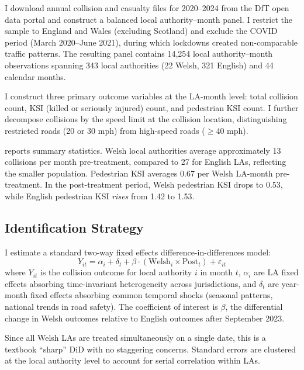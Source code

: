 \documentclass[12pt]{article}
\begin{document}
I download annual collision and casualty files for 2020--2024 from the DfT open data portal and construct a balanced local authority--month panel. I restrict the sample to England and Wales (excluding Scotland) and exclude the COVID period (March 2020--June 2021), during which lockdowns created non-comparable traffic patterns. The resulting panel contains 14,254 local authority--month observations spanning 343 local authorities (22 Welsh, 321 English) and 44 calendar months.

I construct three primary outcome variables at the LA-month level: total collision count, KSI (killed or seriously injured) count, and pedestrian KSI count. I further decompose collisions by the speed limit at the collision location, distinguishing restricted roads (20 or 30 mph) from high-speed roads ($\geq$40 mph).

 reports summary statistics. Welsh local authorities average approximately 13 collisions per month pre-treatment, compared to 27 for English LAs, reflecting the smaller population. Pedestrian KSI averages 0.67 per Welsh LA-month pre-treatment. In the post-treatment period, Welsh pedestrian KSI drops to 0.53, while English pedestrian KSI \emph{rises} from 1.42 to 1.53.

\subsection{Identification Strategy}

I estimate a standard two-way fixed effects difference-in-differences model:
\begin{equation}
Y_{it} = \alpha_i + \delta_t + \beta \cdot (\text{Welsh}_i \times \text{Post}_t) + \varepsilon_{it}
\label{eq:did}
\end{equation}
where $Y_{it}$ is the collision outcome for local authority $i$ in month $t$, $\alpha_i$ are LA fixed effects absorbing time-invariant heterogeneity across jurisdictions, and $\delta_t$ are year-month fixed effects absorbing common temporal shocks (seasonal patterns, national trends in road safety). The coefficient of interest is $\beta$, the differential change in Welsh outcomes relative to English outcomes after September 2023.

Since all Welsh LAs are treated simultaneously on a single date, this is a textbook ``sharp'' DiD with no staggering concerns. Standard errors are clustered at the local authority level to account for serial correlation within LAs.
\end{document}
